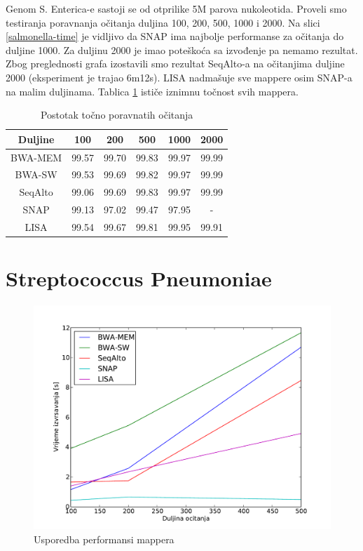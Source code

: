 \documentclass[times, utf8, diplomski]{fer}
\begin{document}
Genom S. Enterica-e sastoji se od otprilike 5M parova nukoleotida. Proveli smo testiranja poravnanja očitanja duljina 100, 200, 500, 1000 i 2000. Na slici \ref{salmonella-time} je vidljivo da SNAP ima najbolje performanse za očitanja do duljine 1000. Za duljinu 2000 je imao poteškoća sa izvođenje pa nemamo rezultat. Zbog preglednosti grafa izostavili smo rezultat SeqAlto-a na očitanjima duljine 2000 (eksperiment je trajao 6m12s). LISA nadmašuje sve mappere osim SNAP-a na malim duljinama. Tablica \ref{salmonella-correct} ističe iznimnu točnost svih mappera.

\begin{table}[H]
\centering
\begin{tabular}{|c||c|c|c|c|c|}
\hline
	Duljine & 100 & 200 & 500 & 1000 & 2000\\
\hline
\hline
	BWA-MEM & 99.57 & 99.70 & 99.83 & 99.97 & 99.99\\
\hline
	BWA-SW  & 99.53 & 99.69 & 99.82 & 99.97 & 99.99\\
\hline
	SeqAlto & 99.06 & 99.69 & 99.83 & 99.97 & 99.99\\
\hline
	SNAP    & 99.13 & 97.02 & 99.47 & 97.95 & -\\
\hline
	LISA    & 99.54 & 99.67 & 99.81 & 99.95 & 99.91\\
\hline
\end{tabular}
\caption{Postotak točno poravnatih očitanja}\label{salmonella-correct}
\end{table}


\section {Streptococcus Pneumoniae}

\begin{figure}[H]
\centering
\includegraphics[width=1.0\textwidth]{../img/streptococcus-time.pdf}
\caption{Usporedba performansi mappera}\label{streptococcus-time}
\end{figure}
\end{document}
